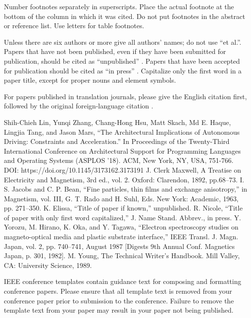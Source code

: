 \documentclass[conference]{IEEEtran}
\begin{document}
Number footnotes separately in superscripts. Place the actual footnote at 
the bottom of the column in which it was cited. Do not put footnotes in the 
abstract or reference list. Use letters for table footnotes.

Unless there are six authors or more give all authors' names; do not use 
``et al.''. Papers that have not been published, even if they have been 
submitted for publication, should be cited as ``unpublished'' \cite{b4}. Papers 
that have been accepted for publication should be cited as ``in press'' \cite{b5}. 
Capitalize only the first word in a paper title, except for proper nouns and 
element symbols.

For papers published in translation journals, please give the English 
citation first, followed by the original foreign-language citation \cite{b6}.

\begin{thebibliography}{00}
 Shih-Chieh Lin, Yunqi Zhang, Chang-Hong Hsu, Matt Skach, Md E. Haque, Lingjia Tang, and Jason Mars, ``The Architectural Implications of Autonomous Driving: Constraints and Acceleration.'' In Proceedings of the Twenty-Third International Conference on Architectural Support for Programming Languages and Operating Systems (ASPLOS '18). ACM, New York, NY, USA, 751-766. DOI: https://doi.org/10.1145/3173162.3173191
 J. Clerk Maxwell, A Treatise on Electricity and Magnetism, 3rd ed., vol. 2. Oxford: Clarendon, 1892, pp.68--73.
 I. S. Jacobs and C. P. Bean, ``Fine particles, thin films and exchange anisotropy,'' in Magnetism, vol. III, G. T. Rado and H. Suhl, Eds. New York: Academic, 1963, pp. 271--350.
 K. Elissa, ``Title of paper if known,'' unpublished.
 R. Nicole, ``Title of paper with only first word capitalized,'' J. Name Stand. Abbrev., in press.
 Y. Yorozu, M. Hirano, K. Oka, and Y. Tagawa, ``Electron spectroscopy studies on magneto-optical media and plastic substrate interface,'' IEEE Transl. J. Magn. Japan, vol. 2, pp. 740--741, August 1987 [Digests 9th Annual Conf. Magnetics Japan, p. 301, 1982].
 M. Young, The Technical Writer's Handbook. Mill Valley, CA: University Science, 1989.
\end{thebibliography}
\vspace{12pt}
\color{red}
IEEE conference templates contain guidance text for composing and formatting conference papers. Please ensure that all template text is removed from your conference paper prior to submission to the conference. Failure to remove the template text from your paper may result in your paper not being published.
\end{document}
